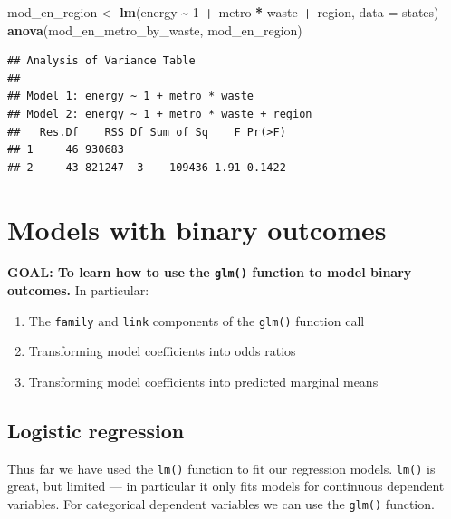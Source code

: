 \documentclass[
]{book}
\newenvironment{Shaded}{\begin{snugshade}}{\end{snugshade}}
\newcommand{\DataTypeTok}[1]{\textcolor[rgb]{0.13,0.29,0.53}{#1}}
\newcommand{\DecValTok}[1]{\textcolor[rgb]{0.00,0.00,0.81}{#1}}
\newcommand{\KeywordTok}[1]{\textcolor[rgb]{0.13,0.29,0.53}{\textbf{#1}}}
\newcommand{\NormalTok}[1]{#1}
\newcommand{\OperatorTok}[1]{\textcolor[rgb]{0.81,0.36,0.00}{\textbf{#1}}}
\newcommand{\StringTok}[1]{\textcolor[rgb]{0.31,0.60,0.02}{#1}}
\providecommand{\tightlist}{%
  \setlength{\itemsep}{0pt}\setlength{\parskip}{0pt}}
\begin{document}
\begin{Shaded}
\begin{Highlighting}[]
\NormalTok{  mod\_en\_region \textless{}{-}}\StringTok{ }\KeywordTok{lm}\NormalTok{(energy }\OperatorTok{\textasciitilde{}}\StringTok{ }\DecValTok{1} \OperatorTok{+}\StringTok{ }\NormalTok{metro }\OperatorTok{*}\StringTok{ }\NormalTok{waste }\OperatorTok{+}\StringTok{ }\NormalTok{region, }\DataTypeTok{data =}\NormalTok{ states)}
  \KeywordTok{anova}\NormalTok{(mod\_en\_metro\_by\_waste, mod\_en\_region)}
\end{Highlighting}
\end{Shaded}

\begin{verbatim}
## Analysis of Variance Table
## 
## Model 1: energy ~ 1 + metro * waste
## Model 2: energy ~ 1 + metro * waste + region
##   Res.Df    RSS Df Sum of Sq    F Pr(>F)
## 1     46 930683                         
## 2     43 821247  3    109436 1.91 0.1422
\end{verbatim}

\hypertarget{models-with-binary-outcomes}{%
\section{Models with binary outcomes}\label{models-with-binary-outcomes}}

\textbf{GOAL: To learn how to use the \texttt{glm()} function to model binary outcomes.} In particular:

\begin{enumerate}
\def\labelenumi{\arabic{enumi}.}
\tightlist
\item
  The \texttt{family} and \texttt{link} components of the \texttt{glm()} function call
\item
  Transforming model coefficients into odds ratios
\item
  Transforming model coefficients into predicted marginal means
\end{enumerate}

\hypertarget{logistic-regression}{%
\subsection{Logistic regression}\label{logistic-regression}}

Thus far we have used the \texttt{lm()} function to fit our regression models. \texttt{lm()} is great, but limited --- in particular it only fits models for continuous dependent variables. For categorical dependent variables we can use the \texttt{glm()} function.
\end{document}
